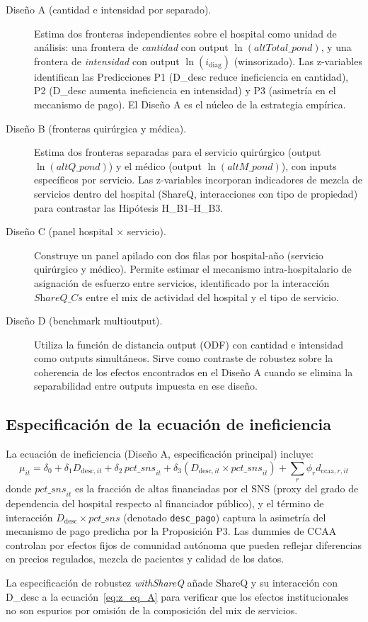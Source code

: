 \begin{description}
  \item[Diseño A (cantidad e intensidad por separado).] Estima dos fronteras independientes sobre el hospital como unidad de análisis: una frontera de \emph{cantidad} con output $\ln(\textit{altTotal\_pond})$, y una frontera de \emph{intensidad} con output $\ln(i_{\text{diag}})$ (winsorizado). Las z-variables identifican las Predicciones P1 (D\_desc reduce ineficiencia en cantidad), P2 (D\_desc aumenta ineficiencia en intensidad) y P3 (asimetría en el mecanismo de pago). El Diseño A es el núcleo de la estrategia empírica.

  \item[Diseño B (fronteras quirúrgica y médica).] Estima dos fronteras separadas para el servicio quirúrgico (output $\ln(\textit{altQ\_pond})$) y el médico (output $\ln(\textit{altM\_pond})$), con inputs específicos por servicio. Las z-variables incorporan indicadores de mezcla de servicios dentro del hospital (ShareQ, interacciones con tipo de propiedad) para contrastar las Hipótesis H\_B1–H\_B3.

  \item[Diseño C (panel hospital $\times$ servicio).] Construye un panel apilado con dos filas por hospital-año (servicio quirúrgico y médico). Permite estimar el mecanismo intra-hospitalario de asignación de esfuerzo entre servicios, identificado por la interacción $\textit{ShareQ\_Cs}$ entre el mix de actividad del hospital y el tipo de servicio.

  \item[Diseño D (benchmark multioutput).] Utiliza la función de distancia output (ODF) con cantidad e intensidad como outputs simultáneos. Sirve como contraste de robustez sobre la coherencia de los efectos encontrados en el Diseño A cuando se elimina la separabilidad entre outputs impuesta en ese diseño.
\end{description}

\subsection{Especificación de la ecuación de ineficiencia}
\label{subsec:z_equation}

La ecuación de ineficiencia (Diseño A, especificación principal) incluye:
%
\begin{equation}
  \mu_{it} = \delta_0 + \delta_1 D_{\text{desc},it} + \delta_2 \,\textit{pct\_sns}_{it}
           + \delta_3 (D_{\text{desc},it} \times \textit{pct\_sns}_{it})
           + \sum_r \phi_r d_{\text{ccaa},r,it}
  \label{eq:z_eq_A}
\end{equation}
%
donde \(\textit{pct\_sns}_{it}\) es la fracción de altas financiadas por el SNS (proxy del grado de dependencia del hospital respecto al financiador público), y el término de interacción \(D_{\text{desc}} \times \textit{pct\_sns}\) (denotado \texttt{desc\_pago}) captura la asimetría del mecanismo de pago predicha por la Proposición P3. Las dummies de CCAA controlan por efectos fijos de comunidad autónoma que pueden reflejar diferencias en precios regulados, mezcla de pacientes y calidad de los datos.

La especificación de robustez \emph{withShareQ} añade ShareQ y su interacción con D\_desc a la ecuación~\eqref{eq:z_eq_A} para verificar que los efectos institucionales no son espurios por omisión de la composición del mix de servicios.
